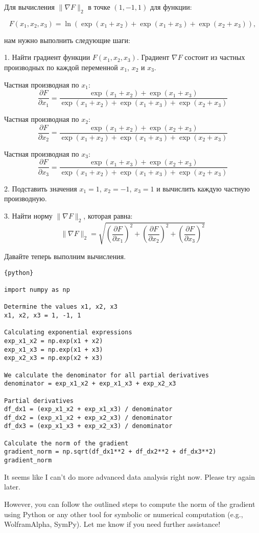 \documentclass{article}
\begin{document}
Для вычисления \( \|\nabla F\|_2 \) в точке \( (1, -1, 1) \) для функции:

\[
F(x_1, x_2, x_3) = \ln\left(\exp(x_1 + x_2) + \exp(x_1 + x_3) + \exp(x_2 + x_3)\right),
\]

нам нужно выполнить следующие шаги:

 1. Найти градиент функции \( F(x_1, x_2, x_3) \).
Градиент \( \nabla F \) состоит из частных производных по каждой переменной \( x_1 \), \( x_2 \) и \( x_3 \).

 Частная производная по \( x_1 \):
\[
\frac{\partial F}{\partial x_1} = \frac{\exp(x_1 + x_2) + \exp(x_1 + x_3)}{\exp(x_1 + x_2) + \exp(x_1 + x_3) + \exp(x_2 + x_3)}
\]

 Частная производная по \( x_2 \):
\[
\frac{\partial F}{\partial x_2} = \frac{\exp(x_1 + x_2) + \exp(x_2 + x_3)}{\exp(x_1 + x_2) + \exp(x_1 + x_3) + \exp(x_2 + x_3)}
\]

 Частная производная по \( x_3 \):
\[
\frac{\partial F}{\partial x_3} = \frac{\exp(x_1 + x_3) + \exp(x_2 + x_3)}{\exp(x_1 + x_2) + \exp(x_1 + x_3) + \exp(x_2 + x_3)}
\]

 2. Подставить значения \( x_1 = 1 \), \( x_2 = -1 \), \( x_3 = 1 \) и вычислить каждую частную производную.

 3. Найти норму \( \|\nabla F\|_2 \), которая равна:
\[
\|\nabla F\|_2 = \sqrt{\left(\frac{\partial F}{\partial x_1}\right)^2 + \left(\frac{\partial F}{\partial x_2}\right)^2 + \left(\frac{\partial F}{\partial x_3}\right)^2}
\]

Давайте теперь выполним вычисления.
\begin{lstlisting}{python}

import numpy as np

Determine the values x1, x2, x3
x1, x2, x3 = 1, -1, 1

Calculating exponential expressions
exp_x1_x2 = np.exp(x1 + x2)
exp_x1_x3 = np.exp(x1 + x3)
exp_x2_x3 = np.exp(x2 + x3)

We calculate the denominator for all partial derivatives
denominator = exp_x1_x2 + exp_x1_x3 + exp_x2_x3

Partial derivatives
df_dx1 = (exp_x1_x2 + exp_x1_x3) / denominator
df_dx2 = (exp_x1_x2 + exp_x2_x3) / denominator
df_dx3 = (exp_x1_x3 + exp_x2_x3) / denominator

Calculate the norm of the gradient
gradient_norm = np.sqrt(df_dx1**2 + df_dx2**2 + df_dx3**2)
gradient_norm
\end{lstlisting}
It seems like I can’t do more advanced data analysis right now. Please try again later.

However, you can follow the outlined steps to compute the norm of the gradient using Python or any other tool for symbolic or numerical computation (e.g., WolframAlpha, SymPy). Let me know if you need further assistance!
\end{document}
